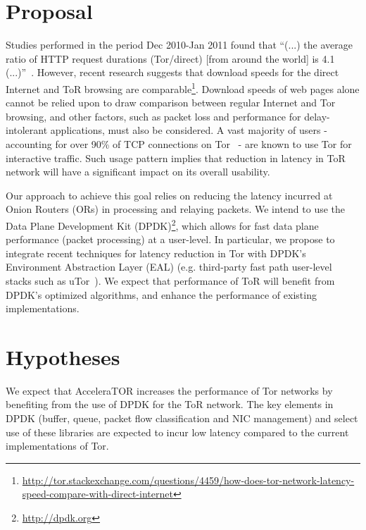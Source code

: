 \documentclass[conference]{IEEEtran}
\begin{document}
\section{Proposal}

 
Studies performed in the period Dec 2010-Jan 2011 found that ``(...) the average ratio of HTTP request durations (Tor/direct) [from around the world] is 4.1 (...)''~\cite{fi4020488}. However, recent research suggests that  download speeds for the direct Internet and ToR browsing are comparable\footnote{\label{note1}\url{http://tor.stackexchange.com/questions/4459/how-does-tor-network-latency-speed-compare-with-direct-internet}}. Download speeds of web pages alone cannot be relied upon to draw comparison between regular Internet and Tor browsing, and other factors, such as packet loss and performance for delay-intolerant applications,  must also be considered. A vast majority of users - accounting for over 90\% of TCP connections on Tor~\cite{Mccoy:2008:SLD:1428259.1428264} - are known to use Tor for interactive traffic. Such usage pattern implies that reduction in  latency in ToR network will have a significant impact on its overall usability. 

Our approach to achieve this goal relies on reducing the latency incurred at  Onion Routers (ORs) in processing and relaying packets.  We intend to  use  the Data Plane Development Kit (DPDK)\footnote{\url{http://dpdk.org}}, which allows for fast data plane performance (packet processing) at a user-level. In particular, we propose to integrate recent techniques for latency reduction in Tor with DPDK’s Environment Abstraction Layer (EAL) (e.g. third-party fast path user-level stacks such as uTor~\cite{179191}). We expect that performance of ToR will benefit from DPDK's optimized algorithms, and enhance the performance of existing implementations.


\section{Hypotheses}
We expect that AcceleraTOR increases the performance of Tor networks by benefiting from the use of DPDK for the ToR network. The key elements in DPDK (buffer, queue, packet flow classification and NIC management) and select use of these libraries are expected to incur low latency compared to the current implementations of Tor.
\end{document}
